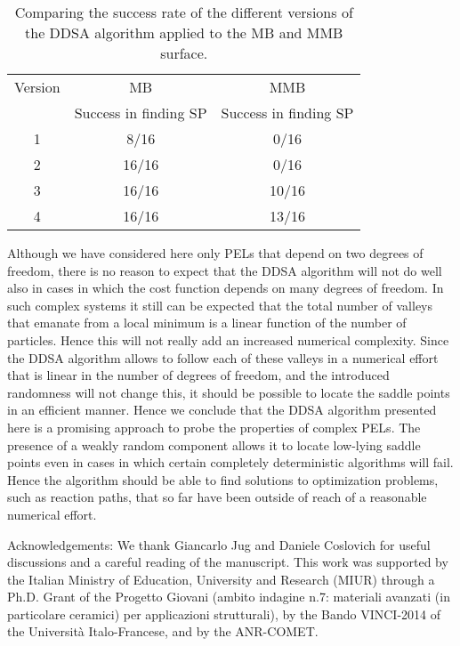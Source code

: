 \documentclass[aip,pre,twocolumn,reprint]{revtex4-1}
\begin{document}
\begin{table}[!t]
\begin{center}
\begin{tabular}{ |c|c|c| }
  \hline
  Version & MB & MMB \\
  & Success in finding SP  & Success in finding SP\\
  \hline
   1 & 8/16 & 0/16 \\
   2 & 16/16 & 0/16 \\
   3 & 16/16 & 10/16 \\
   4 & 16/16 & 13/16  \\
  \hline
\end{tabular}
\caption{Comparing the success rate of the different versions of the DDSA algorithm
applied to the MB and MMB surface.}
\label{tab_imp_extr_alba_tot}
\end{center}
\end{table}

Although we have considered here only PELs that depend on two degrees of
freedom, there is no reason to expect that the DDSA algorithm will not
do well also in cases in which the cost function depends on many degrees
of freedom. In such complex systems it still can be expected that
the total number of valleys that emanate from a local minimum is a linear
function of the number of particles. Hence this will not really
add an increased numerical complexity. Since the DDSA algorithm allows
to follow each of these valleys in a numerical effort that is linear in
the number of degrees of freedom, and the introduced randomness will
not change this, it should be possible to locate the saddle points in an
efficient manner. Hence we conclude that the DDSA algorithm presented here
is a promising approach to probe the properties of complex PELs. The
presence of a weakly random component allows it to locate low-lying
saddle points even in cases in which certain completely deterministic
algorithms will fail. Hence the algorithm should be able to find solutions
to optimization problems, such as reaction paths, that so far have been
outside of reach of a reasonable numerical effort.


Acknowledgements: We thank Giancarlo Jug and Daniele Coslovich for
useful discussions and a careful reading of the manuscript. This work was
supported by the Italian Ministry of Education, University and Research
(MIUR) through a Ph.D. Grant of the Progetto Giovani (ambito indagine
n.7: materiali avanzati (in particolare ceramici) per applicazioni
strutturali), by the Bando VINCI-2014 of the Universit\`a Italo-Francese,
and by the ANR-COMET.



\end{document}
